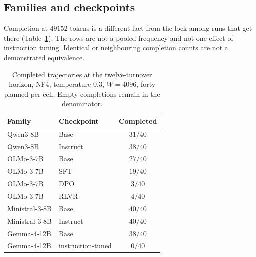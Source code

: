 \documentclass[10pt]{article}
\begin{document}
\subsection{Families and checkpoints}
\label{sec:families}

Completion at $49152$ tokens is a different fact from the lock among
runs that get there
(Table~\ref{tab:completion}).
The rows are not a pooled frequency and not one effect of instruction
tuning.
Identical or neighbouring completion counts are not a demonstrated
equivalence.

\begin{table}[t]
  \centering
  \caption{Completed trajectories at the twelve-turnover horizon,
    NF4, temperature $0.3$, $W{=}4096$, forty planned per cell.
    Empty completions remain in the denominator.} %
  \label{tab:completion}
  \begin{tabular}{@{}llc@{}}
    \toprule
    Family & Checkpoint & Completed \\
    \midrule
    Qwen3-8B & Base & $31/40$ \\ %
    Qwen3-8B & Instruct & $38/40$ \\ %
    OLMo-3-7B & Base & $27/40$ \\ %
    OLMo-3-7B & SFT & $19/40$ \\ %
    OLMo-3-7B & DPO & $3/40$ \\ %
    OLMo-3-7B & RLVR & $4/40$ \\ %
    Ministral-3-8B & Base & $40/40$ \\ %
    Ministral-3-8B & Instruct & $40/40$ \\ %
    Gemma-4-12B & Base & $38/40$ \\ %
    Gemma-4-12B & instruction-tuned & $0/40$ \\ %
    \bottomrule
  \end{tabular}
\end{table}
\end{document}

